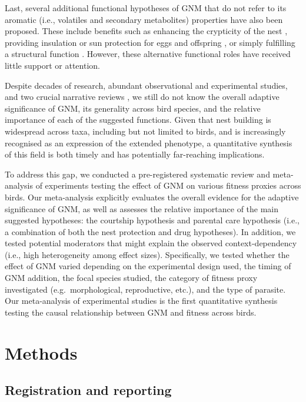 \documentclass[
  number,
  review,
  onecolumn]{elsarticle}
\begin{document}
Last, several additional functional hypotheses of GNM that do not refer
to its aromatic (i.e., volatiles and secondary metabolites) properties
have also been proposed. These include benefits such as enhancing the
crypticity of the nest \citep{skutch1957}, providing insulation or sun
protection for eggs and offspring \citep{mertens1977}, or simply
fulfilling a structural function \citep{lyons1987}. However, these
alternative functional roles have received little support or attention.

Despite decades of research, abundant observational and experimental
studies, and two crucial narrative reviews
\citep{dubiec2013, scott-baumann2015}, we still do not know the overall
adaptive significance of GNM, its generality across bird species, and
the relative importance of each of the suggested functions. Given that
nest building is widespread across taxa, including but not limited to
birds, and is increasingly recognised as an expression of the extended
phenotype, a quantitative synthesis of this field is both timely and has
potentially far-reaching implications.~

To address this gap, we conducted a pre-registered systematic review and
meta-analysis of experiments testing the effect of GNM on various
fitness proxies across birds. Our meta-analysis explicitly evaluates the
overall evidence for the adaptive significance of GNM, as well as
assesses the relative importance of the main suggested hypotheses: the
courtship hypothesis and parental care hypothesis (i.e., a combination
of both the nest protection and drug hypotheses). In addition, we tested
potential moderators that might explain the observed context-dependency
(i.e., high heterogeneity among effect sizes). Specifically, we tested
whether the effect of GNM varied depending on the experimental design
used, the timing of GNM addition, the focal species studied, the
category of fitness proxy investigated (e.g.~morphological,
reproductive, etc.), and the type of parasite. Our meta-analysis of
experimental studies is the first quantitative synthesis testing the
causal relationship between GNM and fitness across birds.

\section{Methods}\label{methods}

\subsection{Registration and
reporting}\label{registration-and-reporting}
\end{document}
